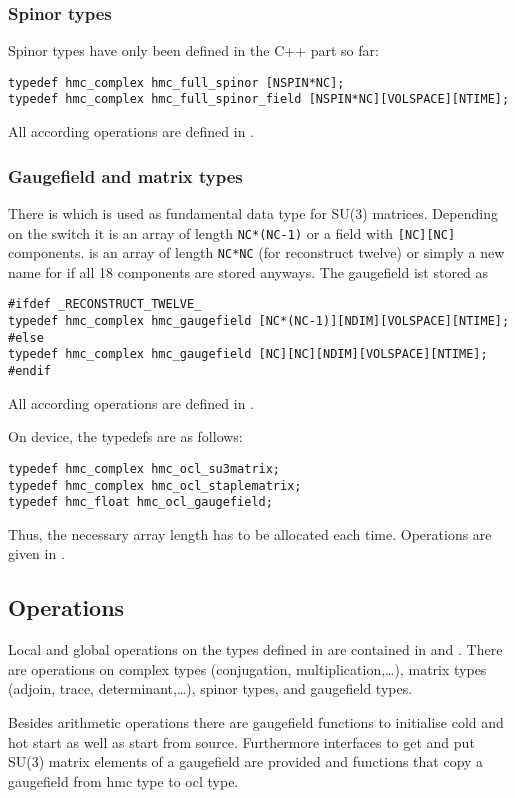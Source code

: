 \subsubsection{Spinor types}
Spinor types have only been defined in the C++ part so far:
\begin{verbatim}
typedef hmc_complex hmc_full_spinor [NSPIN*NC];
typedef hmc_complex hmc_full_spinor_field [NSPIN*NC][VOLSPACE][NTIME];
\end{verbatim}
All according operations are defined in .
\subsubsection{Gaugefield and matrix types}
There is  which is used as fundamental data type for SU(3) matrices. Depending on the switch  it is an array of length \verb+NC*(NC-1)+ or a field with \verb+[NC][NC]+ components.
 is an array of length \verb+NC*NC+ (for reconstruct twelve) or simply a new name for  if all 18 components are stored anyways. The gaugefield ist stored as
\begin{verbatim}
#ifdef _RECONSTRUCT_TWELVE_
typedef hmc_complex hmc_gaugefield [NC*(NC-1)][NDIM][VOLSPACE][NTIME];
#else
typedef hmc_complex hmc_gaugefield [NC][NC][NDIM][VOLSPACE][NTIME];
#endif
\end{verbatim}
All according operations are defined in .

On device, the typedefs are as follows:
\begin{verbatim}
typedef hmc_complex hmc_ocl_su3matrix;
typedef hmc_complex hmc_ocl_staplematrix;
typedef hmc_float hmc_ocl_gaugefield;
\end{verbatim}
Thus, the necessary array length has to be allocated each time. Operations are given in .

\subsection{Operations}
Local and global operations on the types defined in  are contained in  and . There are operations on complex types (conjugation, multiplication,\ldots), matrix types (adjoin, trace, determinant,\ldots), spinor types, and gaugefield types.

Besides arithmetic operations there are gaugefield functions to initialise cold and hot start as well as start from source. Furthermore interfaces to get and put SU(3) matrix elements of a gaugefield are provided and functions that copy a gaugefield from hmc type to ocl type.

